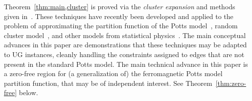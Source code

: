  Theorem~\ref{thm:main,cluster} is proved via the \emph{cluster expansion} and methods given in~\cite{BCHPT19}. 
These techniques have recently been developed and applied to the problem of approximating the partition function of the Potts model~\cite{Barvinok16,BDPR18,BCHPT19,LSS19}, random cluster model~\cite{BCHPT19}, and other models from statistical physics~\cite{Barvinok16,HPR19,PR17}.
The main conceptual advances in this paper are demonstrations that these techniques may be adapted to UG instances, cleanly handling the constraints assigned to edges that are not present in the standard Potts model. 
The main technical advance in this paper is a zero-free region for (a generalization of) the ferromagnetic Potts model partition function, that may be of independent interest. See Theorem~\ref{thm:zero-free} below.
%
%

\setcounter{theorem}{5}
